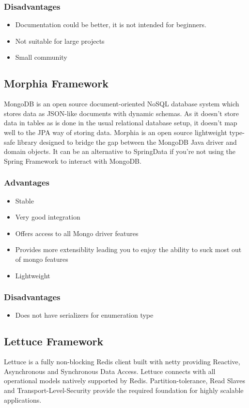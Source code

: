 \documentclass[a4paper, hidelinks, 12pt]{report}
\begin{document}
\subsubsection{Disadvantages}
			\begin{itemize}
		\item{} Documentation could be better, it is not intended for beginners.
		\item{} Not suitable for large projects
		\item{} Small community
		\end{itemize}

\subsection{Morphia Framework}
MongoDB is an open source document-oriented NoSQL database system which stores data as JSON-like documents with dynamic schemas.  As it doesn't store data in tables as is done in the usual relational database setup, it doesn't map well to the JPA way of storing data. Morphia is an open source lightweight type-safe library designed to bridge the gap between the MongoDB Java driver and domain objects. It can be an alternative to SpringData if you're not using the Spring Framework to interact with MongoDB.

\subsubsection{Advantages}

		\begin{itemize}
		\item{} Stable
	\item{} Very good integration
	\item{} Offers access to all Mongo driver features
	\item{} Provides more extensiblity leading you to enjoy the ability to suck most out of mongo features
	\item{} Lightweight
		\end{itemize}
\subsubsection{Disadvantages}
			\begin{itemize}
		\item{} Does not have serializers for enumeration type
		\end{itemize}

\subsection{Lettuce Framework}
 Lettuce is a fully non-blocking Redis client built with netty providing Reactive, Asynchronous and Synchronous Data Access. Lettuce connects with all operational models natively supported by Redis. Partition-tolerance, Read Slaves and Transport-Level-Security provide the required foundation for highly scalable applications.
\end{document}
